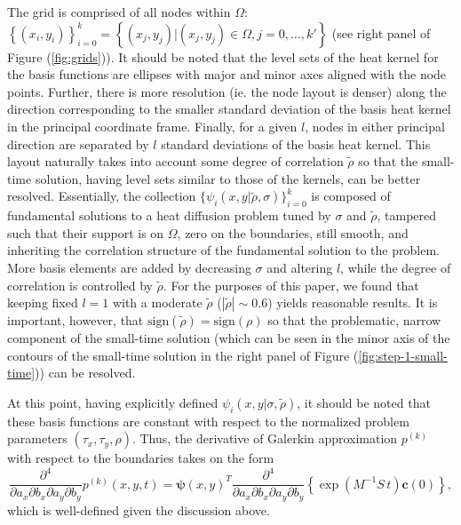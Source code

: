 \documentclass[10pt]{article}
\begin{document}
The grid is comprised of all nodes within $\Omega$:
$\left\{(x_i, y_i)\right\}_{i=0}^k = \left\{ (x_j, y_j) | (x_j, y_j)
  \in \Omega, j = 0, \ldots, k' \right\}$ (see right panel of Figure
(\ref{fig:grids})). It should be noted that the level sets of the heat
kernel for the basis functions are ellipses with major and minor axes
aligned with the node points. Further, there is more resolution
(ie. the node layout is denser) along the direction corresponding to
the smaller standard deviation of the basis heat kernel in the
principal coordinate frame. Finally, for a given $l$, nodes in either
principal direction are separated by $l$ standard deviations of the
basis heat kernel. This layout naturally takes into account some
degree of correlation $\tilde{\rho}$ so that the small-time solution,
having level sets similar to those of the kernels, can be better
resolved. Essentially, the collection
$\{ \psi_i(x,y| \tilde{\rho}, \sigma) \}_{i=0}^k$ is composed of
fundamental solutions to a heat diffusion problem tuned by $\sigma$
and $\tilde{\rho}$, tampered such that their support is on $\Omega$,
zero on the boundaries, still smooth, and inheriting the correlation
structure of the fundamental solution to the problem. More basis
elements are added by decreasing $\sigma$ and altering $l$, while the
degree of correlation is controlled by $\tilde{\rho}$. For
the purposes of this paper, we found that keeping fixed $l=1$ with a
moderate $\tilde{\rho}$ ($|\tilde{\rho}| \sim 0.6$) yields reasonable
results. It is important, however, that
$\mbox{sign}(\tilde{\rho}) = \mbox{sign}(\rho)$ so that the
problematic, narrow component of the small-time solution (which can be
seen in the minor axis of the contours of the small-time solution in
the right panel of Figure (\ref{fig:step-1-small-time})) can be
resolved.

%

At this point, having explicitly defined
$\psi_i(x,y|\sigma,\tilde{\rho})$, it should be noted that these basis
functions are constant with respect to the normalized problem
parameters $(\tau_x, \tau_y, \rho)$. Thus, the derivative of Galerkin
approximation $p^{(k)}$ with respect to the boundaries takes on the
form
\[
  \frac{\partial^4}{\partial a_x \partial b_x \partial a_y \partial
    b_y} p^{(k)}(x,y,t) = \boldsymbol{\psi}(x,y)^T
  \frac{\partial^4}{\partial a_x \partial b_x \partial a_y \partial
    b_y} \left\{ \exp\left( M^{-1}S\, t \right) \mathbf{c}(0) \right\},
\]
which is well-defined given the discussion above.
\end{document}
